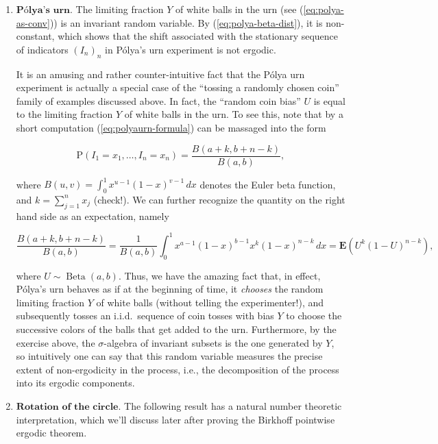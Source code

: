 \documentclass[11pt]{report}
\theoremstyle{plain}
\theoremstyle{definition}
\newtheorem{xexercise}[thm]{Exercise}
\begin{document}
\begin{enumerate}[label=\arabic*.]
\begin{xexercise}
Show that the $\sigma$-algebra $\mathcal{I}$ of invariant subsets for this process coincides with the $\sigma$-algebra $\sigma(U)$ generated by the random coin bias $U$. That means that, not only is $U$ an invariant random variable, but any other invariant random variable can be computed once the value of $U$ is known.
\end{xexercise}
\item $\textbf{Pólya's urn.}$ The limiting fraction $Y$ of white balls in the urn (see (\ref{eq:polya-as-conv})) is an invariant random variable. By (\ref{eq:polya-beta-dist}), it is non-constant, which shows that the shift associated  with the stationary sequence of indicators $(I_n)_n$ in Pólya's urn experiment is not ergodic.

It is an amusing and rather counter-intuitive fact that the Pólya urn experiment is actually a special case of the ``tossing a randomly chosen coin'' family of examples discussed above. In fact, the ``random coin bias'' $U$ is equal to the limiting fraction $Y$ of white balls in the urn. To see this, note that by a short computation (\ref{eq:polyaurn-formula}) can be massaged into the form

\[
\mathrm{P}(I_1=x_1, \ldots, I_n=x_n) = \frac{B(a+k, b+n-k)}{B(a,b)},
\]

where $B(u,v)=\int_0^1 x^{u-1}(1-x)^{v-1}\,dx$ denotes the Euler beta function, and $k=\sum_{j=1}^n x_j$ (check!). We can further recognize the quantity on the right hand side as an expectation, namely

\[
\frac{B(a+k, b+n-k)}{B(a,b)}= \frac{1}{B(a,b)}\int_0^1 x^{a-1}(1-x)^{b-1} x^k(1-x)^{n-k}\,dx = \mathbf{E}(U^k(1-U)^{n-k}),
\]

where $U\sim \operatorname{Beta}(a,b)$. Thus, we have the amazing fact that, in effect, Pólya's urn behaves as if at the beginning of time, it \emph{chooses} the random limiting fraction $Y$ of white balls (without telling the experimenter!), and subsequently tosses an i.i.d.\ sequence of coin tosses with bias $Y$ to choose the successive colors of the balls that get added to the urn. Furthermore, by the exercise above, the $\sigma$-algebra of invariant subsets is the one generated by $Y$, so intuitively one can say that this random variable measures the precise extent of non-ergodicity in the process, i.e., the decomposition of the process into its ergodic components.
\item $\textbf{Rotation of the circle.}$ The following result has a natural number theoretic interpretation, which we'll discuss later after proving the Birkhoff pointwise ergodic theorem.


\end{enumerate}
\end{document}
